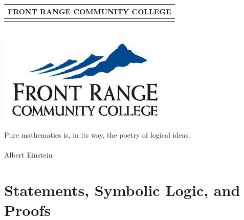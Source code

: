 \documentclass[oneside]{book}
\begin{document}
\begin{center} 
    \begin{minipage}{\textwidth}
        \maketitle
        \begin{center}
        \begin{tabular}{c}
            FRONT RANGE COMMUNITY COLLEGE \\
            \hline \\
        \end{tabular}
        \\
        \includegraphics[scale=0.5]{Graphics/FRCC.jpeg}
        \end{center}
    \end{minipage}
\end{center}

\frontmatter

\tableofcontents

\setcounter{tocdepth}{4}
\setcounter{secnumdepth}{4}

\pagebreak

\mainmatter

\begin{savequote}
Pure mathematics is, in its way, the poetry of logical ideas.
\\
\\
Albert Einstein
\end{savequote}
\chapter{Statements, Symbolic Logic, and Proofs}

    


\end{document}
